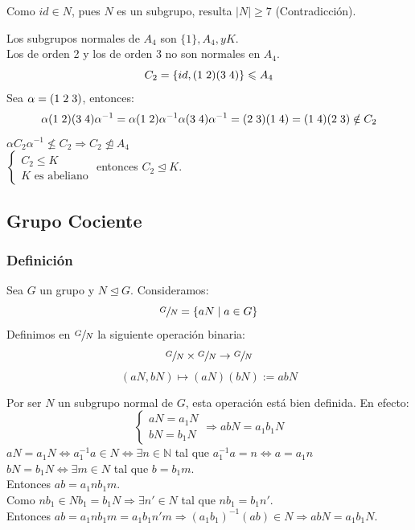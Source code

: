 \documentclass[11pt,a4paper]{article}
\begin{document}
Como $id \in N$, pues $N$ es un subgrupo, resulta $|N| \geq 7$ (Contradicción).

Los subgrupos normales de $A_{4}$ son $\{1\}, A_{4}, y K$. \\
Los de orden 2 y los de orden 3 no son normales en $A_{4}$.
$$C_{2} = \{id, (1 \hspace{0.1cm} 2)(3 \hspace{0.1cm} 4)\} \leqslant A_{4}$$
Sea $\alpha = (1 \hspace{0.1cm} 2 \hspace{0.1cm} 3)$, entonces:
$$\alpha (1 \hspace{0.1cm} 2)(3 \hspace{0.1cm} 4) \alpha^{-1} = \alpha(1 \hspace{0.1cm} 2) \alpha^{-1} \alpha (3 \hspace{0.1cm} 4) \alpha^{-1} = (2 \hspace{0.1cm} 3)(1 \hspace{0.1cm} 4) = (1 \hspace{0.1cm} 4)(2 \hspace{0.1cm} 3) \notin C_{2}$$
$\alpha C_{2} \alpha^{-1} \nleqslant C_{2} \Rightarrow C_{2} \ntrianglelefteq A_{4}$ \\
$\begin{cases}
C_{2} \leqslant K \\
K \text{ es abeliano}
\end{cases}$
entonces $C_{2} \unlhd K$.

\subsection{Grupo Cociente}

\subsubsection*{Definición}

Sea $G$ un grupo y $N \unlhd G$. Consideramos:
$$\sfrac{G}{N} = \{aN \mid a \in G\}$$
Definimos en $\sfrac{G}{N}$ la siguiente operación binaria:
$$\sfrac{G}{N} \times \sfrac{G}{N} \to \sfrac{G}{N}$$
$$(aN, bN) \mapsto (aN)(bN) := abN$$

Por ser $N$ un subgrupo normal de $G$, esta operación está bien definida. En efecto:
\begin{equation*}
\begin{cases}
aN = a_{1}N \\
bN = b_{1}N
\end{cases}
\Rightarrow abN = a_{1}b_{1}N
\end{equation*}
$aN = a_{1}N \iff a_{1}^{-1}a \in N \iff \exists n \in \mathbb{N}$ tal que $a_{1}^{-1}a = n \iff a = a_{1}n$ \\
$bN = b_{1}N \iff \exists m \in N$ tal que $b = b_{1} m$. \\
Entonces $ab = a_{1}nb_{1}m$. \\
Como $nb_{1} \in Nb_{1} = b_{1}N \Rightarrow \exists n' \in N$ tal que $nb_{1} = b_{1}n'$. \\
Entonces $ab = a_{1}nb_{1}m = a_{1}b_{1}n'm \Rightarrow (a_{1}b_{1})^{-1}(ab) \in N \Rightarrow abN = a_{1}b_{1}N$.
\end{document}
